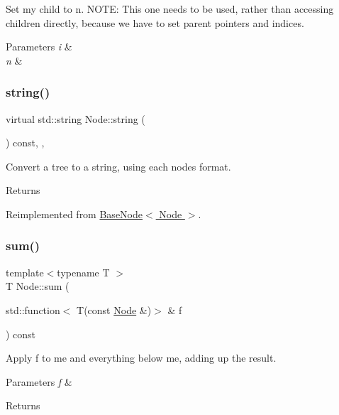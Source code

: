 Set my child to n. N\+O\+TE\+: This one needs to be used, rather than accessing children directly, because we have to set parent pointers and indices. 
\begin{DoxyParams}{Parameters}
{\em i} & \\
\hline
{\em n} & \\
\hline
\end{DoxyParams}
\mbox{\label{class_node_a2c58ff9b0904718f568ac71f499cd17f}} 
\subsubsection{\texorpdfstring{string()}{string()}}
{\footnotesize\ttfamily virtual std\+::string Node\+::string (\begin{DoxyParamCaption}{ }\end{DoxyParamCaption}) const\hspace{0.3cm}{\ttfamily [inline]}, {\ttfamily [override]}, {\ttfamily [virtual]}}

Convert a tree to a string, using each node\textquotesingle{}s format. \begin{DoxyReturn}{Returns}

\end{DoxyReturn}


Reimplemented from \hyperlink{class_base_node_ac26bf9f89abeaca8d43b73f2d8d1d9cf}{Base\+Node$<$ Node $>$}.

\mbox{\label{class_node_ac91282056a0df2835f1579bdd21c93e1}} 
\subsubsection{\texorpdfstring{sum()}{sum()}\hspace{0.1cm}{\footnotesize\ttfamily [1/2]}}
{\footnotesize\ttfamily template$<$typename T $>$ \\
T Node\+::sum (\begin{DoxyParamCaption}\item[{std\+::function$<$ T(const \hyperlink{class_node}{Node} \&)$>$ \&}]{f }\end{DoxyParamCaption}) const\hspace{0.3cm}{\ttfamily [inline]}}

Apply f to me and everything below me, adding up the result. 
\begin{DoxyParams}{Parameters}
{\em f} & \\
\hline
\end{DoxyParams}
\begin{DoxyReturn}{Returns}

\end{DoxyReturn}
\mbox{\label{class_node_a089e99addd93f91b2ef5a9d0c3e6bdeb}} 

